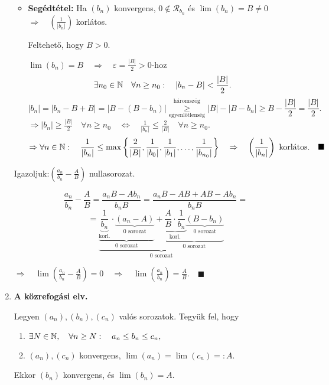 \documentclass[a4paper,11.5pt]{article}
\begin{document}
\begin{enumerate}
		\biz
		
		\begin{itemize}[~~~~~~~~]
			\item \textbf{Segédtétel:} Ha $(b_n)$ konvergens, $0\not\in\mathcal{R}_{b_n}$ és $\lim(b_n)=B\not=0$\quad $\Rightarrow\displaystyle\quad \left(\frac{1}{|b_n|}\right)$ korlátos.
			
			\biz Feltehető, hogy $B>0$.
			
			$\lim(b_n)=B\quad \Rightarrow\quad \varepsilon=\displaystyle\frac{|B|}{2}>0\text{-hoz }$
			\[ \exists n_0\in\mathbb{N}\quad \forall n\geq n_0:\quad |b_n-B|<\frac{|B|}{2}.\]
			\[ |b_n|=|b_n-B+B|=|B-(B-b_n)|\overset{\text{háromszög}}{\underset{\text{egyenlőtlenség}}{\geq}} |B|-|B-b_n|\geq B-\frac{|B|}{2}=\frac{|B|}{2}. \]
			$\Rightarrow |b_n|\geq \displaystyle\frac{|B|}{2}\quad \forall n\geq n_0 \quad \Leftrightarrow \quad \frac{1}{|b_n|}\leq \frac{2}{|B|}\quad \forall n\geq n_0.$
			\[ \Rightarrow \forall n\in\mathbb{N}:\quad \frac{1}{|b_n|}\leq \max\left\{ \frac{2}{|B|},\frac{1}{|b_0|},\frac{1}{|b_1|},\ldots,\frac{1}{|b_{n_0}|} \right\}\quad \Rightarrow\quad \left(\frac{1}{|b_n|}\right)\text{ korlátos.}\quad \blacksquare \]
		\end{itemize}
		Igazoljuk:\quad $\displaystyle\left(\frac{a_n}{b_n}-\frac{A}{B}\right)$ nullasorozat.
		
		\[ \frac{a_n}{b_n}-\frac{A}{B}=\frac{a_nB-Ab_n}{b_nB}=\frac{a_nB-AB+AB-Ab_n}{b_nB}=\]
		\[=\underbrace{\underbrace{\underbrace{\frac{1}{b_n}}_{\text{korl.}}\cdot\underbrace{\left(a_n-A\right)}_{\text{0 sorozat}}}_{\text{0 sorozat}}+\underbrace{\underbrace{\frac{A}{B}\cdot\frac{1}{b_n}}_{\text{korl.}}\underbrace{(B-b_n)}_{\text{0 sorozat}}}_{\text{0 sorozat}}}_{\text{0 sorozat}} \]
		
		$\Rightarrow \quad \lim\left(\displaystyle\frac{a_n}{b_n}-\displaystyle\frac{A}{B}\right)=0\quad \Rightarrow\quad \lim\left(\displaystyle\frac{a_n}{b_n}\right)=\displaystyle\frac{A}{B}.\quad \blacksquare$
		
		\item \textbf{A közrefogási elv.}
		
		Legyen $(a_n), (b_n), (c_n)$ valós sorozatok. Tegyük fel, hogy
		\begin{enumerate}
			\item $\exists N\in\mathbb{N},\quad \forall n\geq N:\quad a_n\leq b_n\leq c_n,$
			\item $(a_n), (c_n)$ konvergens, $\lim(a_n)=\lim(c_n)=:A.$
		\end{enumerate}
		Ekkor $(b_n)$ konvergens, és $\lim(b_n)=A$.
		

\end{enumerate}
\end{document}
